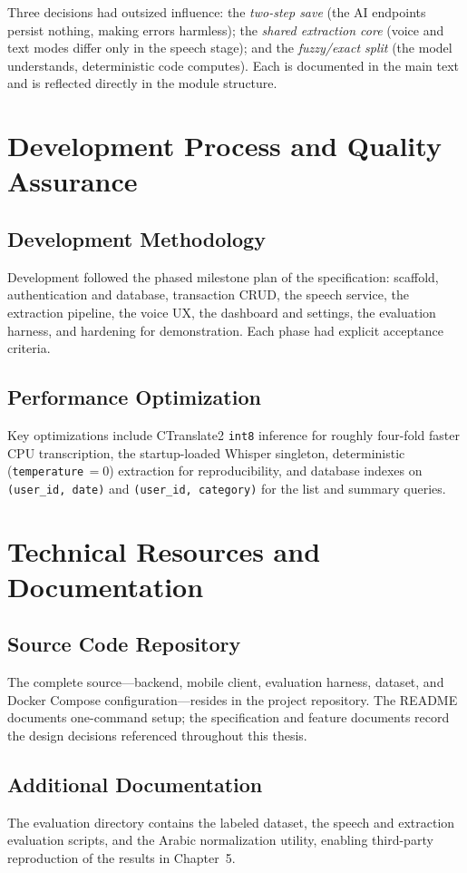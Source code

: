 Three decisions had outsized influence: the \emph{two-step save} (the AI endpoints
persist nothing, making errors harmless); the \emph{shared extraction core} (voice
and text modes differ only in the speech stage); and the \emph{fuzzy/exact split}
(the model understands, deterministic code computes). Each is documented in the
main text and is reflected directly in the module structure.

\section{Development Process and Quality Assurance}

\subsection{Development Methodology}

Development followed the phased milestone plan of the specification: scaffold,
authentication and database, transaction CRUD, the speech service, the extraction
pipeline, the voice UX, the dashboard and settings, the evaluation harness, and
hardening for demonstration. Each phase had explicit acceptance criteria.

\subsection{Performance Optimization}

Key optimizations include CTranslate2 \texttt{int8} inference for roughly four-fold
faster CPU transcription, the startup-loaded Whisper singleton, deterministic
(\texttt{temperature}\,$=0$) extraction for reproducibility, and database indexes on
\texttt{(user\_id, date)} and \texttt{(user\_id, category)} for the list and summary
queries.

\section{Technical Resources and Documentation}

\subsection{Source Code Repository}

The complete source---backend, mobile client, evaluation harness, dataset, and
Docker Compose configuration---resides in the project repository. The README
documents one-command setup; the specification and feature documents record the
design decisions referenced throughout this thesis.

\subsection{Additional Documentation}

The evaluation directory contains the labeled dataset, the speech and extraction
evaluation scripts, and the Arabic normalization utility, enabling third-party
reproduction of the results in Chapter~5.
